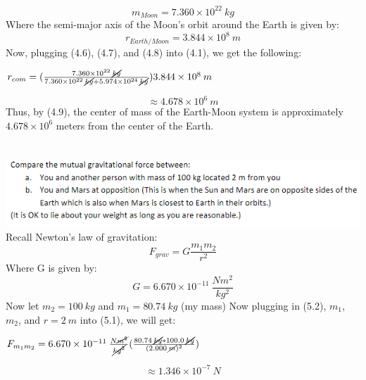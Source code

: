 \documentclass{article}
\begin{document}
\begin{equation}
    m_{Moon} = 7.360\times10^{22}\:kg
\end{equation}
Where the semi-major axis of the Moon's orbit around the Earth is given by:
\begin{equation}
    r_{Earth/Moon} = 3.844\times10^{8}\:m
\end{equation}
Now, plugging (4.6), (4.7), and (4.8) into (4.1), we get the following:
\begin{center}
    $r_{com} = (\frac{7.360\times10^{22}\:\cancel{kg}}{7.360\times10^{22}\:\cancel{kg} + 5.974\times10^{24}\:\cancel{kg}})3.844\times10^8\:m$
\end{center}
\begin{equation}
    \approx 4.678\times10^6\:m
\end{equation}
Thus, by (4.9), the center of mass of the Earth-Moon system is approximately $4.678\times10^6$ meters from the center of the Earth.



\section{}
\includegraphics[scale = 0.8]{problemset1q5.PNG}
Recall Newton's law of gravitation:
\begin{equation}
    F_{grav} = G\frac{m_1m_2}{r^2}
\end{equation}
Where G is given by:
\begin{equation}
    G = 6.670\times10^{-11}\:\frac{Nm^2}{kg^2}
\end{equation}
Now let $m_2 = 100\:kg$ and $m_1 = 80.74\: kg$ (my mass)
\newline
Now plugging in (5.2), $m_1$, $m_2$, and $r = 2\:m$ into (5.1), we will get:
\begin{center}
    $F_{m_1m_2} = 6.670\times10^{-11}\:\frac{N\cancel{m^2}}{\cancel{kg^2}}(\frac{80.74\:\cancel{kg}*100.0\:\cancel{kg}}{(2.000\:\cancel{m})^2})$
\end{center}
\begin{equation}
    \approx 1.346\times10^{-7}\:N
\end{equation}
\end{document}
